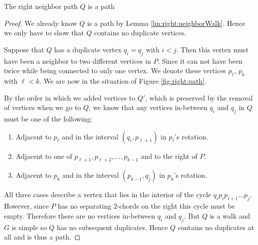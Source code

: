    \begin{lemma}
      \label{lm:right:neighborPath}
      The right neighbor path $Q$ is a path
    \end{lemma}
    \begin{proof}
      We already know $Q$ is a path by Lemma \ref{lm:right:neighborWalk}. Hence we only have to show that $Q$ contains no duplicate vertices.

      Suppose that $Q$ has a duplicate vertex $q_i=q_j$ with $i<j$. Then this vertex must have been a neighbor to two different vertices in $P$. Since it can not have been twice while being connected to only one vertex. We denote these vertices $p_\ell$, $p_k$ with $\ell<k$. We are now in the situation of Figure \ref{fig:right:path}.

      By the order in which we added vertices to $Q'$, which is preserved by the removal of vertices when we go to $Q$, we know that any vertices in-between $q_i$ and $q_j$ in $Q$ must be one of the following:
      \begin{enumerate}
        \item Adjacent to $p_\ell$ and in the interval $(q_i, p_{\ell+1})$ in $p_\ell$'s rotation.
        \item Adjacent to one of $p_{\ell+1},  p_{\ell+2},\ldots, p_{k-1}$ and to the right of $P$.
        \item Adjacent to $p_k$ and in the interval $(p_{k-1}, q_j)$ in $p_k$'s rotation.
      \end{enumerate}


      All three cases describe a vertex that lies in the interior of the cycle $q_i p_i p_{i+1} \ldots p_j$. However, since $P$ has no separating $2$-chords on the right this cycle must be empty. Therefore there are no vertices in-between $q_i$ and $q_j$. But $Q$ is a walk and $G$ is simple  so $Q$ has no subsequent duplicates. Hence $Q$ contains no duplicates at all and is thus a path.
    \end{proof}

